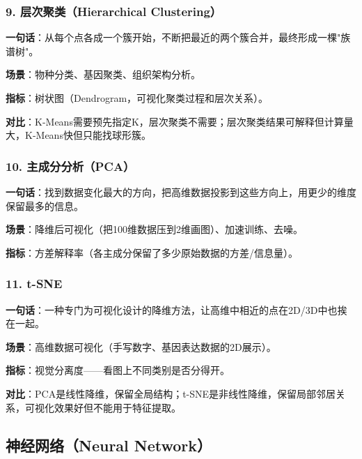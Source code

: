 \documentclass[12pt,a4paper]{ctexart}
\begin{document}
\subsubsection{9. 层次聚类（Hierarchical Clustering）}

\begin{funbox}
\textbf{一句话}：从每个点各成一个簇开始，不断把最近的两个簇合并，最终形成一棵"族谱树"。

\textbf{场景}：物种分类、基因聚类、组织架构分析。

\textbf{指标}：树状图（Dendrogram，可视化聚类过程和层次关系）。

\textbf{对比}：K-Means需要预先指定K，层次聚类不需要；层次聚类结果可解释但计算量大，K-Means快但只能找球形簇。
\end{funbox}

\subsubsection{10. 主成分分析（PCA）}

\begin{funbox}[PCA]
\textbf{一句话}：找到数据变化最大的方向，把高维数据投影到这些方向上，用更少的维度保留最多的信息。

\textbf{场景}：降维后可视化（把100维数据压到2维画图）、加速训练、去噪。

\textbf{指标}：方差解释率（各主成分保留了多少原始数据的方差/信息量）。
\end{funbox}

\subsubsection{11. t-SNE}

\begin{funbox}[t-SNE]
\textbf{一句话}：一种专门为可视化设计的降维方法，让高维中相近的点在2D/3D中也挨在一起。

\textbf{场景}：高维数据可视化（手写数字、基因表达数据的2D展示）。

\textbf{指标}：视觉分离度——看图上不同类别是否分得开。

\textbf{对比}：PCA是线性降维，保留全局结构；t-SNE是非线性降维，保留局部邻居关系，可视化效果好但不能用于特征提取。
\end{funbox}

\subsection{神经网络（Neural Network）}
\end{document}
